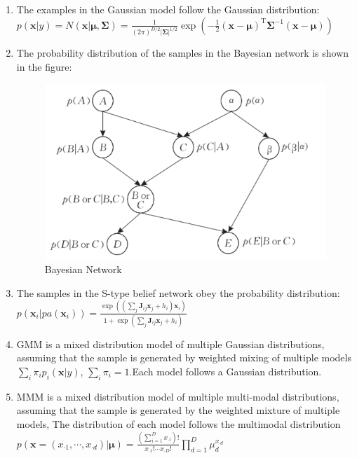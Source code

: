 \documentclass[11pt,en]{elegantpaper}
\begin{document}
\begin{enumerate}
	\item The examples in the Gaussian model follow the Gaussian distribution: \\
		$p(\boldsymbol{x} | y)=N(\boldsymbol{x} | \boldsymbol{\mu}, \boldsymbol{\Sigma})=\frac{1}{(2 \pi)^{D / 2}|\boldsymbol{\Sigma}|^{1 / 2}} \exp \left(-\frac{1}{2}(\boldsymbol{x}-\boldsymbol{\mu})^{\mathrm{T}} \boldsymbol{\Sigma}^{-1}(\boldsymbol{x}-\boldsymbol{\mu})\right)$
	\item The probability distribution of the samples in the Bayesian network is shown in the figure: \\
		\begin{figure}[H]
		\centering
		\includegraphics[scale=0.4]{figure/bys.png}
		\caption{Bayesian Network}
		\end{figure}
	\item The samples in the S-type belief network obey the probability distribution:\\
	$p\left(\boldsymbol{x}_{i} | p a\left(\boldsymbol{x}_{i}\right)\right)=\frac{\exp \left(\left(\sum_{j} \boldsymbol{J}_{i j} \boldsymbol{x}_{j}+h_{i}\right) \boldsymbol{x}_{i}\right)}{1+\exp \left(\sum_{j} \boldsymbol{J}_{i j} \boldsymbol{x}_{j}+h_{i}\right)}$
	\item GMM is a mixed distribution model of multiple Gaussian distributions, assuming that the sample is generated by weighted mixing of multiple models $\sum_{i} \pi_{i} p_{i}(\boldsymbol{x} | y)$, $\sum_{i} \pi_{i}=1$.Each model follows a Gaussian distribution.
	\item MMM is a mixed distribution model of multiple multi-modal distributions, assuming that the sample is generated by the weighted mixture of multiple models, The distribution of each model follows the multimodal distribution $p\left(\boldsymbol{x}=\left(x_{\cdot 1}, \cdots, x_{\cdot d}\right) | \boldsymbol{\mu}\right)=\frac{\left(\sum_{i=1}^{D} x_{\cdot i}\right) !}{x_{\cdot 1} ! \cdots x_{\cdot D} !} \prod_{d=1}^{D} \mu_{d}^{x_{\cdot d}}$

\end{enumerate}
\end{document}

